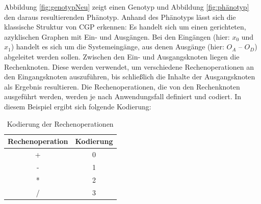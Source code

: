 Abbildung \ref{fig:genotypNeu} zeigt einen Genotyp und Abbildung \ref{fig:phänotyp} den daraus resultierenden Phänotyp.
Anhand des Phänotyps lässt sich die klassische Struktur von CGP erkennen:
Es handelt sich um einen gerichteten, azyklischen Graphen mit Ein- und Ausgängen.
Bei den Eingängen (hier: $x_0$ und $x_1$) handelt es sich um die Systemeingänge, aus denen Ausgänge (hier: $O_A$ – $O_D$) abgeleitet werden sollen.
Zwischen den Ein- und Ausgangsknoten liegen die Rechenknoten.
Diese werden verwendet, um verschiedene Rechenoperationen an den Eingangsknoten auszuführen, bis schließlich die Inhalte der Ausgangsknoten als Ergebnis resultieren.
Die Rechenoperationen, die von den Rechenknoten ausgeführt werden, werden je nach Anwendungsfall definiert und codiert.
In diesem Beispiel ergibt sich folgende Kodierung:

\begin{table}[h]
    \centering
    \begin{tabular}{c|c}
       \textbf{Rechenoperation} & \textbf{Kodierung} \\ \hline
        + & 0 \\ \hline
        - & 1 \\ \hline
        * & 2 \\ \hline
        / & 3
    \end{tabular}
    \caption{Kodierung der Rechenoperationen}
    \label{table:kodierung}
\end{table}

